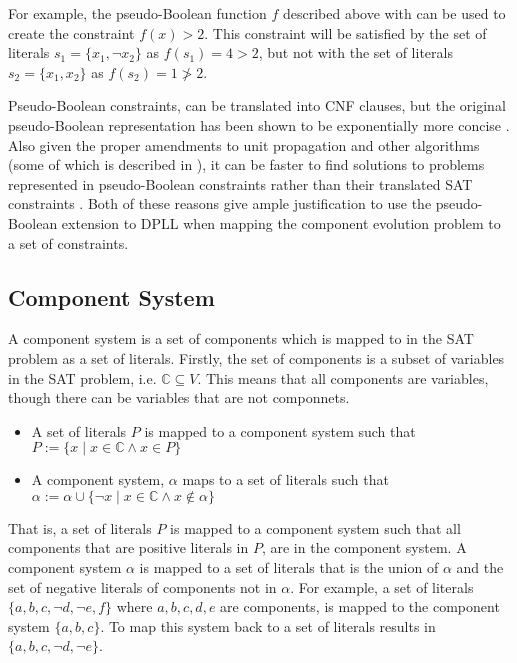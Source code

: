 For example, the pseudo-Boolean function $f$ described above with can be used to create the constraint $f(x) > 2$.
This constraint will be satisfied by the set of literals $s_1 = \{ x_1, \neg x_2 \}$ as $f(s_1) = 4 > 2$, but not with the set of literals $s_2 = \{ x_1,  x_2 \}$ as $f(s_2) = 1 \not > 2$.

Pseudo-Boolean constraints, can be translated into CNF clauses, but the original pseudo-Boolean representation has been shown to be exponentially more concise \citep{dixon2004automating}.
Also given the proper amendments to unit propagation and other algorithms (some of which is described in \citep{Sheini2006}), 
it can be faster to find solutions to problems represented in pseudo-Boolean constraints rather than their translated SAT constraints \citep{dixon2004automating}.
Both of these reasons give ample justification to use the pseudo-Boolean extension to DPLL when mapping the component evolution problem to a set of constraints. 

\subsection{Component System}
A component system is a set of components which is mapped to in the SAT problem as a set of literals.
Firstly, the set of components is a subset of variables in the SAT problem, i.e. $\mathbb{C} \subseteq V$.
This means that all components are variables, though there can be variables that are not componnets.


\begin{itemize}
  \item A set of literals $P$ is mapped to a component system such that $P := \{x \mid x \in \mathbb{C} \wedge x \in P\}$
  \item A component system, $\alpha$ maps to a set of literals such that $\alpha := \alpha \cup \{\neg x \mid x \in \mathbb{C} \wedge x \not \in \alpha\}$
\end{itemize}
That is, a set of literals $P$ is mapped to a component system such that all components that are positive literals in $P$, are in the component system.
A component system $\alpha$ is mapped to a set of literals that is the union of $\alpha$ and the set of negative literals of components not in $\alpha$.
For example, a set of literals $\{a,b,c,\neg d,\neg e,f\}$ where $a,b,c,d,e$ are components, is mapped to the component system $\{a,b,c\}$.
To map this system back to a set of literals results in $\{a,b,c,\neg d,\neg e\}$.

